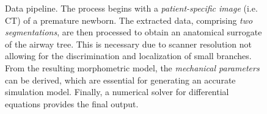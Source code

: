 \begin{figure}[h!]
{
  }
  \caption{Data pipeline.  The process begins with a
    \emph{patient-specific image} (i.e. CT) of a premature newborn.
    The extracted data, comprising \emph{two segmentations}, are then
    processed to obtain an anatomical surrogate of the airway tree.
    This is necessary due to scanner resolution not allowing for the
    discrimination and localization of small branches.  From the
    resulting morphometric model, the \emph{mechanical parameters} can
    be derived, which are essential for generating an accurate
    simulation model.  Finally, a numerical solver for differential
    equations provides the final output.}
  \label{fig:data_pipeline}
\end{figure}


